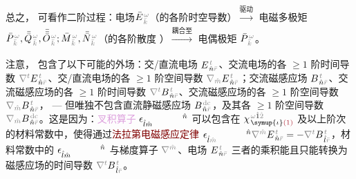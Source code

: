 总之， 可看作二阶过程：电场$\bar{E}^{\;\!\mathcolor{gray}{\omega}}_{\;\!\mathcolor{gray}{\bar{k}}}$（的各阶时空导数）$\xrightarrow[]{\text{驱动}}$ \textcolor{NavyBlue}{电磁多}极矩 $\bar{P}^{\;\!\mathcolor{gray}{\omega}}_{\;\!\mathcolor{gray}{\bar{k}}},\bar{\bar{Q}}^{\;\!\mathcolor{gray}{\omega}}_{\;\!\mathcolor{gray}{\bar{k}}},\bar{\bar{\bar{O}}}^{\;\!\mathcolor{gray}{\omega}}_{\;\!\mathcolor{gray}{\bar{k}}}; \bar{M}^{\;\!\mathcolor{gray}{\omega}}_{\;\!\mathcolor{gray}{\bar{k}}},\bar{\bar{N}}^{\;\!\mathcolor{gray}{\omega}}_{\;\!\mathcolor{gray}{\bar{k}}}$（的各阶散度 ）$\xrightarrow[]{\text{耦合至}}$ \textcolor{NavyBlue}{电偶}极矩 $\bar{P}^{\;\!\mathcolor{gray}{\omega}}_{\;\!\mathcolor{gray}{\bar{k}}}$。

注意， 包含了以下可能的外场：交/直流电场 $E^{\;\!\mathcolor{gray}{t}}_{\;\! \hat{n} \mathcolor{gray}{\bar{r}}}$、交流电场的各 $\geq 1$ 阶时间导数 $\mathcolor{gray}{\nabla^t} E^{\;\!\mathcolor{gray}{t}}_{\;\! \hat{n} \mathcolor{gray}{\bar{r}}}$、交/直流电场的各 $\geq 1$ 阶空间导数 $\mathcolor{gray}{\nabla_{\hat{m}}} E^{\;\!\mathcolor{gray}{t}}_{\;\! \hat{n} \mathcolor{gray}{\bar{r}}}$；交流磁感应场 $B^{\;\!\mathcolor{gray}{t}}_{\;\! \hat{n} \mathcolor{gray}{\bar{r}}}$、交流磁感应场的各 $\geq 1$ 阶时间导数 $\mathcolor{gray}{\nabla^t} B^{\;\!\mathcolor{gray}{t}}_{\;\! \hat{n} \mathcolor{gray}{\bar{r}}}$、交流磁感应场的各 $\geq 1$ 阶空间导数 $\mathcolor{gray}{\nabla_{\hat{m}}} B^{\;\!\mathcolor{gray}{t}}_{\;\! \hat{n} \mathcolor{gray}{\bar{r}}}$， ---  但唯独不包含直流静磁感应场 $B^{\;\!\mathcolor{gray}{\text{dc}}}_{\;\! \hat{n} \mathcolor{gray}{\bar{r}}}$，及其各 $\geq 1$ 阶空间导数 $\mathcolor{gray}{\nabla_{\hat{m}}} B^{\;\!\mathcolor{gray}{\text{dc}}}_{\;\! \hat{n} \mathcolor{gray}{\bar{r}}}$。这是因为：\textcolor{Plum}{叉积算子} $\epsilon^{\hphantom{\symup{\iota}\hat{m}}\hat{n}}_{\hat{l}\hat{m}}$ 可以包含在 $\chi^{\;\! \mathcolor{gray}{\omega} \hat{1} \mathcolor{gray}{\hat{2}}}_{\;\! \symup{\iota} \textcolor{Maroon}{(1)}}$ 及以上阶次的材料常数中，使得通过\textcolor{Maroon}{法拉第电磁感应定律} $\epsilon^{\hphantom{\symup{\iota}\hat{m}}\hat{n}}_{\hat{l}\mathcolor{gray}{\hat{m}}} \mathcolor{gray}{\nabla^{\hat{m}}} E^{\;\!\mathcolor{gray}{t}}_{\;\! \hat{n} \mathcolor{gray}{\bar{r}}} = - \mathcolor{gray}{\nabla^t} B^{\;\!\mathcolor{gray}{t}}_{\;\! \hat{l} \mathcolor{gray}{\bar{r}}}$，材料常数中的 $\epsilon^{\hphantom{\symup{\iota}\hat{m}}\hat{n}}_{\hat{l}\hat{m}}$ 与梯度算子 $\mathcolor{gray}{\nabla^{\hat{m}}}$、电场 $E^{\;\!\mathcolor{gray}{t}}_{\;\! \hat{n} \mathcolor{gray}{\bar{r}}}$ 三者的乘积能且只能转换为磁感应场的时间导数 $\mathcolor{gray}{\nabla^t} B^{\;\!\mathcolor{gray}{t}}_{\;\! \hat{l} \mathcolor{gray}{\bar{r}}}$。


